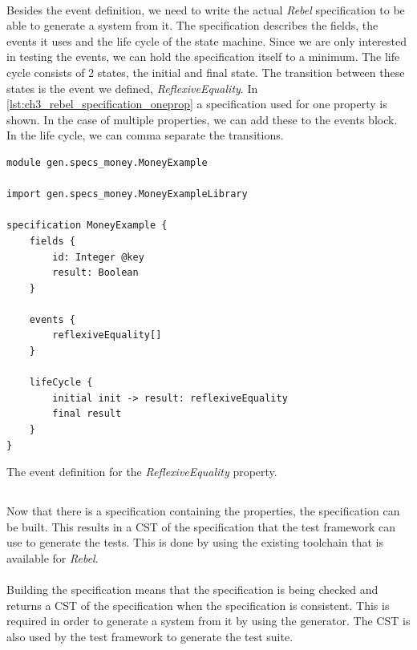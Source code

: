 \\
Besides the event definition, we need to write the actual \textit{Rebel}
specification to be able to generate a system from it. The specification
describes the fields, the events it uses and the life cycle of the state
machine. Since we are only interested in testing the events, we can hold the
specification itself to a minimum. The life cycle consists of 2 states, the
initial and final state. The transition between these states is the event we
defined, \textit{ReflexiveEquality}. In
\autoref{lst:ch3_rebel_specification_oneprop} a specification used for one
property is shown. In the case of multiple properties, we can add these to the
events block. In the life cycle, we can comma separate the transitions.
\begin{sourcecode}[!ht]
\begin{lstlisting}[language=Rebel]
module gen.specs_money.MoneyExample

import gen.specs_money.MoneyExampleLibrary

specification MoneyExample {
	fields {
        id: Integer @key
		result: Boolean
	}

	events {
		reflexiveEquality[]
	}

	lifeCycle {
		initial init -> result:	reflexiveEquality
		final result
	}
}
\end{lstlisting}
\caption{The event definition for the \textit{ReflexiveEquality} property.}
\label{lst:ch3_rebel_specification_oneprop}
\end{sourcecode}
\FloatBarrier\noindent

\subsection{\tfPhaseTwo{}}
Now that there is a specification containing the properties, the specification
can be built. This results in a CST of the specification that the test framework
can use to generate the tests. This is done by using the existing toolchain that
is available for \textit{Rebel}.\\
\\
Building the specification means that the specification is being checked and
returns a CST of the specification when the specification is consistent. This is
required in order to generate a system from it by using the generator. The CST
is also used by the test framework to generate the test suite.


